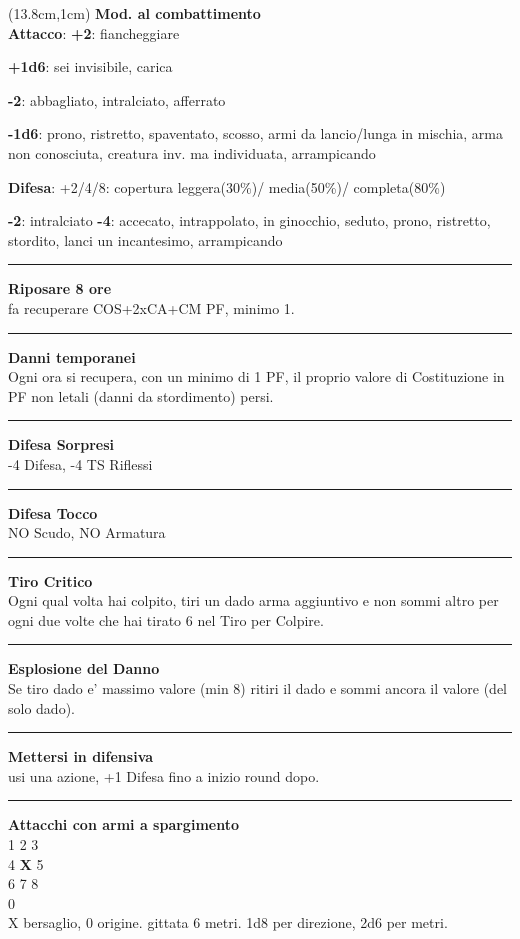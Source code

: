 \documentclass[a4paper,12 pt,openany]{book}
\newcommand{\riga}{\rule{\textwidth}{0.4pt}}
\begin{document}
\begin{textblock*}{6.2cm}(13.8cm,1cm) %
\textbf{Mod. al combattimento}\\
\textbf{Attacco}:
\textbf{+2}: fiancheggiare

\textbf{+1d6}: sei invisibile, carica

\textbf{-2}: abbagliato, intralciato, afferrato

\textbf{-1d6}: prono, ristretto, spaventato, scosso, armi da lancio/lunga in mischia, arma non conosciuta, creatura inv. ma individuata, arrampicando

\textbf{Difesa}: +2/4/8: copertura leggera(30\%)/ media(50\%)/ completa(80\%)

\textbf{-2}: intralciato \textbf{-4}: accecato, intrappolato, in ginocchio, seduto, prono, ristretto, stordito, lanci un incantesimo, arrampicando
\riga

\textbf{Riposare 8 ore} \\fa recuperare COS+2xCA+CM PF, minimo 1.

\riga

\textbf{Danni temporanei}\\ Ogni ora si recupera, con un minimo di 1 PF, il proprio valore di Costituzione in PF non letali (danni da stordimento) persi.

\riga

\textbf{Difesa Sorpresi}\\ -4 Difesa, -4 TS Riflessi

\riga

\textbf{Difesa Tocco}\\ NO Scudo, NO Armatura

\riga

\textbf{Tiro Critico}\\
Ogni qual volta hai colpito, tiri un dado arma aggiuntivo e non sommi altro per ogni due volte che hai tirato 6 nel Tiro per Colpire.

\riga

\textbf{Esplosione del Danno}\\
Se tiro dado e' massimo valore (min 8) ritiri il dado e sommi ancora il valore (del solo dado).

\riga

\textbf{Mettersi in difensiva}\\
usi una azione, +1 Difesa fino a inizio round dopo.


\riga

\textbf{Attacchi con armi a spargimento}\\
		1 2 3\\
		4 \textbf{X} 5\\
		6 7 8\\
		0\\
		X bersaglio, 0 origine. gittata 6 metri. 1d8 per direzione, 2d6 per metri.


\end{textblock*}
\end{document}
